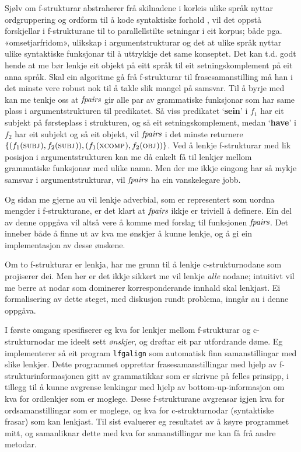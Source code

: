 \documentclass[12pt,a4paper,oneside,draft]{report}
\newcommand{\F}[2]{\textsc{#1}\ensuremath{_{#2}}}
\newcommand{\OBJ}{\F{obj}{}}
\newcommand{\XCOMP}{\F{xcomp}{}}
\newcommand{\SUBJ}{\F{subj}{}}
\newcommand{\fpairs}{\ensuremath{\operatorname{\emph{fpairs}}}}
\newcommand{\p}[1]{`\textbf{#1}'}
\begin{document}
Sjølv om f\hyp{}strukturar abstraherer frå skilnadene i korleis ulike
 språk nyttar ordgruppering og ordform til å kode syntaktiske forhold
 \citep[s.~14]{bresnan2001lfs}, vil det oppstå forskjellar i
 f\hyp{}strukturane til to parallellstilte setningar i eit korpus;
 både pga. «omsetjarfridom», ulikskap i argumentstrukturar og det at
 ulike språk nyttar ulike syntaktiske funksjonar til å uttrykkje det
 same konseptet. Det kan t.d. godt hende at me bør lenkje eit objekt
 på eitt språk til eit setningskomplement på eit anna språk. Skal ein
 algoritme gå frå f\hyp{}strukturar til frasesamanstilling må han i
 det minste vere robust nok til å takle slik mangel på samsvar. Til å
 byrje med kan me tenkje oss at \fpairs{} gir alle par av grammatiske
 funksjonar som har same plass i argumentstrukturen til predikatet. Så
 viss predikatet \p{sein} i $f_1$ har eit subjekt på førsteplass i
 strukturen, og så eit setningskomplement, medan \p{have} i $f_2$ har
 eit subjekt og så eit objekt, vil \fpairs{} i det minste returnere
 $\{(f_{1}(\SUBJ),f_{2}(\SUBJ)),(f_{1}(\XCOMP),f_{2}(\OBJ))\}$.  Ved å
 lenkje f-strukturar med lik posisjon i argumentstrukturen kan me då
 enkelt få til lenkjer mellom grammatiske funksjonar med ulike namn.
 Men der me ikkje eingong har så mykje samsvar i argumentstrukturar,
 vil \fpairs{} ha ein vanskelegare jobb.

Og sidan me gjerne au vil lenkje adverbial, som er representert som
 uordna mengder i f\hyp{}strukturane, er det klart at \fpairs{} ikkje
 er triviell å definere. Ein del av denne oppgåva vil altså vere å
 komme med forslag til funksjonen \fpairs{}. Det inneber både å finne
 ut av kva me ønskjer å kunne lenkje, og å gi ein implementasjon av
 desse ønskene.

Om to f\hyp{}strukturar er lenkja, har me grunn til å lenkje
 c\hyp{}strukturnodane som projiserer dei. Men her er det ikkje sikkert me
 vil lenkje \emph{alle} nodane; intuitivt vil me berre at nodar som
 dominerer korresponderande innhald skal lenkjast.  Ei formalisering
 av dette steget, med diskusjon rundt problema, inngår au i denne
 oppgåva.

I første omgang spesifiserer eg kva for lenkjer mellom
 f\hyp{}strukturar og c\hyp{}strukturnodar me ideelt sett \emph{ønskjer}, og
 drøftar eit par utfordrande døme. Eg implementerer så eit program
 \texttt{lfgalign} som automatisk finn samanstillingar med slike lenkjer.
 Dette programmet opprettar frasesamanstillingar med hjelp av
 f\hyp{}strukturinformasjonen gitt av grammatikkar som er skrivne på
 felles prinsipp, i tillegg til å kunne avgrense lenkingar med hjelp
 av bottom-up-informasjon om kva for ordlenkjer som er moglege. Desse
 f\hyp{}strukturane avgrensar igjen kva for ordsamanstillingar som er
 moglege, og kva for c\hyp{}strukturnodar (syntaktiske frasar) som kan
 lenkjast. Til sist evaluerer eg resultatet av å køyre programmet
 mitt, og samanliknar dette med kva for samanstillingar me kan få frå
 andre metodar.
\end{document}
